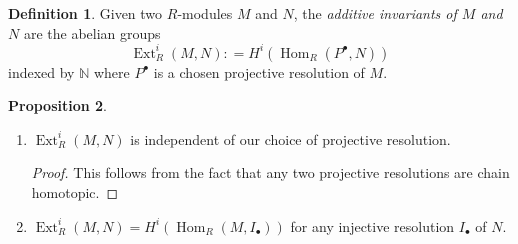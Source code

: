 \documentclass[10pt,letterpaper,cm]{nupset}
\theoremstyle{definition}
\newtheorem{definition}{Definition}[subsection]
\theoremstyle{theorem}
\newtheorem{prop}[definition]{Proposition}
\theoremstyle{remark}
\newcommand{\N}{\mathbb N}
\newcommand{\1}{\mathbf{1}}
\newcommand{\0}{\vec 0}
\DeclareMathOperator{\ext}{Ext}
\DeclareMathOperator{\Hom}{Hom}
\begin{document}
\begin{definition}
Given two $R$-modules $M$ and $N$, the \textit{additive invariants of $M$ and $N$} are the abelian groups $$\ext^i_R (M, N): = H^i(\Hom_R(P^{\bullet}, N))$$ indexed by $\N$  where $P^{\bullet}$ is a chosen projective resolution of $M$. 
\end{definition}

\begin{prop}\label{prop2} $ $
\begin{enumerate}
\item $\ext^i_R(M, N)$ is independent of our choice of projective resolution. 
\begin{proof}
This follows from the fact that any two projective resolutions are chain homotopic.
\end{proof}
\item $\ext^i_R(M, N) = H^i(\Hom_R(M, I_{\bullet}))$ for any injective resolution $I_{\bullet}$ of $N$.
\end{enumerate}
\end{prop}
\end{document}
